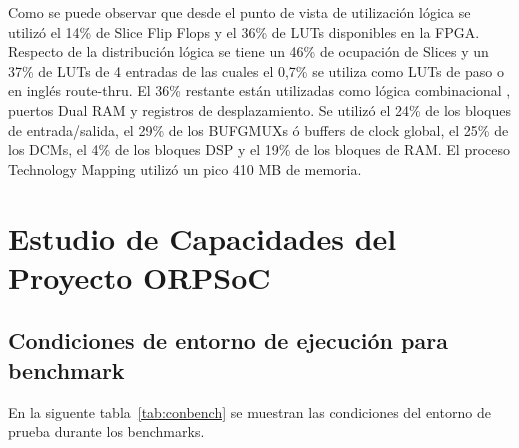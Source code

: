 	Como se puede observar que desde el punto de vista de utilización lógica se utilizó el 14\% de Slice Flip Flops y el 36\% de LUTs disponibles en
	la FPGA. Respecto de la distribución lógica se tiene un 46\% de ocupación de Slices y un 37\% de LUTs de 4 entradas de las cuales el 0,7\% se utiliza
	como LUTs de paso o en inglés route-thru. El 36\% restante están utilizadas como lógica combinacional , puertos Dual RAM y registros de
	desplazamiento. Se utilizó el 24\% de los bloques de entrada/salida, el 29\% de los BUFGMUXs ó buffers de clock global, el 25\% de los DCMs, el 4\%
	de los bloques DSP y el 19\% de los bloques de RAM. El proceso Technology Mapping utilizó un pico 410 MB de memoria.  

%
%
%
%

\newpage		
\section {Estudio de Capacidades del Proyecto ORPSoC}	
		\subsection{Condiciones de entorno de ejecución para benchmark}
		
		En la siguente tabla~\ref{tab:conbench} se muestran las condiciones del entorno de prueba durante los benchmarks.  

